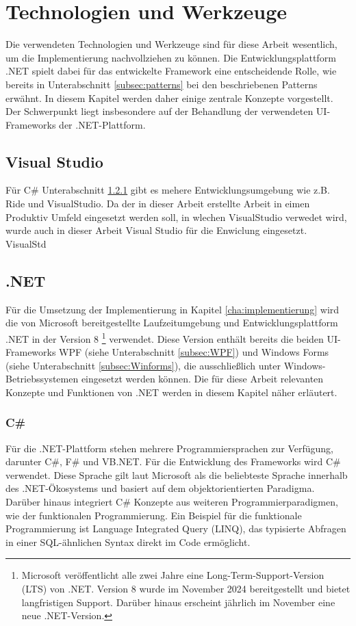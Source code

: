 \chapter{Technologien und Werkzeuge}
\label{cha:technologie_werkzeuge}
Die verwendeten Technologien und Werkzeuge sind für diese Arbeit wesentlich, um die Implementierung nachvollziehen zu können. Die Entwicklungsplattform .NET spielt dabei für das entwickelte Framework eine entscheidende Rolle, wie bereits in Unterabschnitt \ref{subsec:patterns} bei den beschriebenen Patterns erwähnt. In diesem Kapitel werden daher einige zentrale Konzepte vorgestellt. Der Schwerpunkt liegt insbesondere auf der Behandlung der verwendeten UI-Frameworks der .NET-Plattform.

\section{Visual Studio}
\label{sec:visual_studio}
Für C\# {Unterabschnitt \ref{subsec:csharp}} gibt es mehere Entwicklungsumgebung wie z.B. Ride und VisualStudio. Da der in dieser Arbeit erstellte Arbeit in eimen Produktiv Umfeld eingesetzt werden soll, in wlechen VisualStudio verwedet wird, wurde auch in dieser Arbeit Visual Studio für die Enwiclung eingesetzt. VisualStd

\section{.NET}
\label{sec:dotnet}
Für die Umsetzung der Implementierung in Kapitel \ref{cha:implementierung} wird die von Microsoft bereitgestellte Laufzeitumgebung und Entwicklungsplattform .NET \cite{dotnet} in der Version 8 \footnote{Microsoft veröffentlicht alle zwei Jahre eine Long-Term-Support-Version (LTS) von .NET. Version 8 wurde im November 2024 bereitgestellt und bietet langfristigen Support. Darüber hinaus erscheint jährlich im November eine neue .NET-Version.} verwendet. Diese Version enthält bereits die beiden UI-Frameworks WPF (siehe Unterabschnitt \ref{subsec:WPF}) und Windows Forms (siehe Unterabschnitt \ref{subsec:Winforms}), die ausschließlich unter Windows-Betriebssystemen eingesetzt werden können. Die für diese Arbeit relevanten Konzepte und Funktionen von .NET werden in diesem Kapitel näher erläutert.

\subsection{C\#}
\label{subsec:csharp}
Für die .NET-Plattform stehen mehrere Programmiersprachen zur Verfügung, darunter C\#, F\# und VB.NET. Für die Entwicklung des Frameworks wird C\# verwendet. Diese Sprache gilt laut Microsoft \cite{microsoft-tour-of-csharp} als die beliebteste Sprache innerhalb des .NET-Ökosystems und basiert auf dem objektorientierten Paradigma. Darüber hinaus integriert C\# Konzepte aus weiteren Programmierparadigmen, wie der funktionalen Programmierung. Ein Beispiel für die funktionale Programmierung ist Language Integrated Query (LINQ), das typisierte Abfragen in einer SQL-ähnlichen Syntax direkt im Code ermöglicht.

